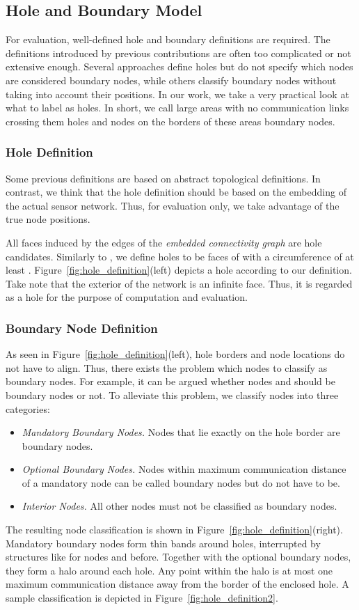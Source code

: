 \documentclass{llncs}
\begin{document}
\subsection{Hole and Boundary Model}
For evaluation, well-defined hole and boundary definitions are required.
The definitions introduced by previous contributions are often too complicated or not extensive enough.
Several approaches define holes but do not specify which nodes are considered boundary nodes, while others classify boundary nodes without taking into account their positions.
In our work, we take a very practical look at what to label as holes.
In short, we call large areas with no communication links crossing them holes and nodes on the borders of these areas boundary nodes.

\subsubsection{Hole Definition}
Some previous definitions are based on abstract topological definitions.
In contrast, we think that the hole definition should be based on the embedding of the actual sensor network.
Thus, for evaluation only, we take advantage of the true node positions.

All faces induced by the edges of the \emph{embedded connectivity graph}  are hole candidates.
Similarly to \cite{kfpf-dbrte-06}, we define holes to be faces of  with a circumference of at least .
Figure~\ref{fig:hole_definition}(left) depicts a hole according to our definition.
Take note that the exterior of the network is an infinite face.
Thus, it is regarded as a hole for the purpose of computation and evaluation.

\subsubsection{Boundary Node Definition}
As seen in Figure~\ref{fig:hole_definition}(left), hole borders and node locations do not have to align.
Thus, there exists the problem which nodes to classify as boundary nodes.
For example, it can be argued whether nodes  and  should be boundary nodes or not.
To alleviate this problem, we classify nodes into three categories:
\begin{itemize}
	\item \emph{Mandatory Boundary Nodes.} Nodes that lie exactly on the hole border are boundary nodes.
	\item \emph{Optional Boundary Nodes.} Nodes within maximum communication distance of a mandatory node can be called boundary nodes but do not have to be.
	\item \emph{Interior Nodes.} All other nodes must not be classified as boundary nodes.
\end{itemize}
The resulting node classification is shown in Figure~\ref{fig:hole_definition}(right).
Mandatory boundary nodes form thin bands around holes, interrupted by structures like for nodes  and  before.
Together with the optional boundary nodes, they form a halo around each hole.
Any point within the halo is at most one maximum communication distance away from the border of the enclosed hole.
A sample classification is depicted in Figure~\ref{fig:hole_definition2}.
\end{document}
